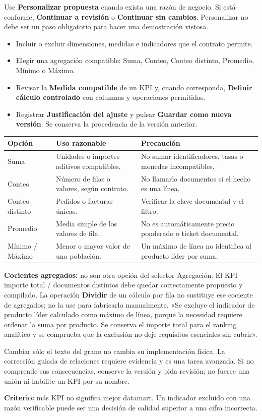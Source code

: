 Use \textbf{Personalizar propuesta} cuando exista una razón de negocio. Si está conforme, \textbf{Continuar a revisión} o \textbf{Continuar sin cambios}. Personalizar no debe ser un paso obligatorio para hacer una demostración vistosa.
\begin{itemize}
\item Incluir o excluir dimensiones, medidas e indicadores que el contrato permite.
\item Elegir una agregación compatible: Suma, Conteo, Conteo distinto, Promedio, Mínimo o Máximo.
\item Revisar la \textbf{Medida compatible} de un KPI y, cuando corresponda, \textbf{Definir cálculo controlado} con columnas y operaciones permitidas.
\item Registrar \textbf{Justificación del ajuste} y pulsar \textbf{Guardar como nueva versión}. Se conserva la procedencia de la versión anterior.
\end{itemize}
\begin{tabularx}{\linewidth}{@{}p{30mm}YY@{}}
\toprule
\textbf{Opción}&\textbf{Uso razonable}&\textbf{Precaución}\\
\midrule
Suma&Unidades o importes aditivos compatibles.&No sumar identificadores, tasas o monedas incompatibles.\\
Conteo&Número de filas o valores, según contrato.&No llamarlo documentos si el hecho es una línea.\\
Conteo distinto&Pedidos o facturas únicas.&Verificar la clave documental y el filtro.\\
Promedio&Media simple de los valores de fila.&No es automáticamente precio ponderado o ticket documental.\\
Mínimo / Máximo&Menor o mayor valor de una población.&Un máximo de línea no identifica al producto líder por suma.\\
\bottomrule
\end{tabularx}
\textbf{Cocientes agregados:} no son otra opción del selector Agregación. El KPI importe total / documentos distintos debe quedar correctamente propuesto y compilado. La operación \textbf{Dividir} de un cálculo por fila no sustituye ese cociente de agregados; no la use para fabricarlo manualmente.
«Se excluye el indicador de producto líder calculado como máximo de línea, porque la necesidad requiere ordenar la suma por producto. Se conserva el importe total para el ranking analítico y se comprueba que la exclusión no deje requisitos esenciales sin cubrir».
\begin{note}
Cambiar sólo el texto del grano no cambia su implementación física. La corrección guiada de relaciones requiere evidencia y es una tarea avanzada. Si no comprende sus consecuencias, conserve la versión y pida revisión; no fuerce una unión ni habilite un KPI por su nombre.
\end{note}
\textbf{Criterio:} más KPI no significa mejor datamart. Un indicador excluido con una razón verificable puede ser una decisión de calidad superior a una cifra incorrecta.

